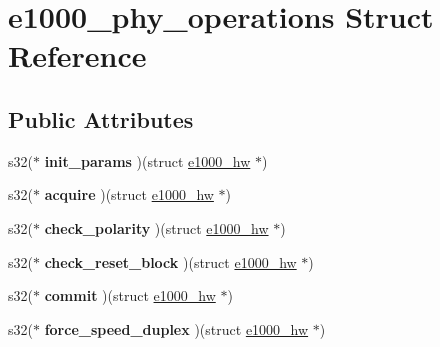 \hypertarget{structe1000__phy__operations}{
\section{e1000\_\-phy\_\-operations Struct Reference}
\label{structe1000__phy__operations}
}
\subsection*{Public Attributes}
\begin{DoxyCompactItemize}
\item 
\hypertarget{structe1000__phy__operations_a9563288ace18007ae744c77b40fe7778}{
s32($\ast$ {\bfseries init\_\-params} )(struct \hyperlink{structe1000__hw}{e1000\_\-hw} $\ast$)}
\label{structe1000__phy__operations_a9563288ace18007ae744c77b40fe7778}

\item 
\hypertarget{structe1000__phy__operations_a314f4e57f824936d4c1e04ca3873a35d}{
s32($\ast$ {\bfseries acquire} )(struct \hyperlink{structe1000__hw}{e1000\_\-hw} $\ast$)}
\label{structe1000__phy__operations_a314f4e57f824936d4c1e04ca3873a35d}

\item 
\hypertarget{structe1000__phy__operations_af549053e918a3be46a10ee7d54a17d3d}{
s32($\ast$ {\bfseries check\_\-polarity} )(struct \hyperlink{structe1000__hw}{e1000\_\-hw} $\ast$)}
\label{structe1000__phy__operations_af549053e918a3be46a10ee7d54a17d3d}

\item 
\hypertarget{structe1000__phy__operations_a698894a29d023b0e61f0c62cbe699505}{
s32($\ast$ {\bfseries check\_\-reset\_\-block} )(struct \hyperlink{structe1000__hw}{e1000\_\-hw} $\ast$)}
\label{structe1000__phy__operations_a698894a29d023b0e61f0c62cbe699505}

\item 
\hypertarget{structe1000__phy__operations_abbe3ceaebf59e49cbf9516770838b6be}{
s32($\ast$ {\bfseries commit} )(struct \hyperlink{structe1000__hw}{e1000\_\-hw} $\ast$)}
\label{structe1000__phy__operations_abbe3ceaebf59e49cbf9516770838b6be}

\item 
\hypertarget{structe1000__phy__operations_a3aa6e068e42d7b51ab2621bbbba71910}{
s32($\ast$ {\bfseries force\_\-speed\_\-duplex} )(struct \hyperlink{structe1000__hw}{e1000\_\-hw} $\ast$)}
\label{structe1000__phy__operations_a3aa6e068e42d7b51ab2621bbbba71910}


\end{DoxyCompactItemize}
